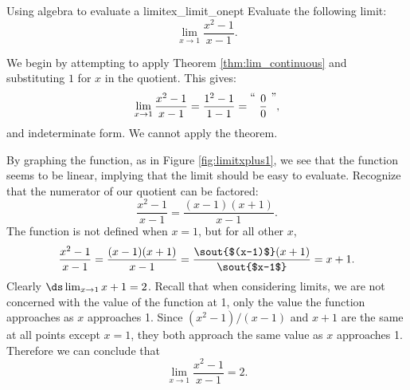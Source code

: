 \begin{example}{Using algebra to evaluate a limit}{ex_limit_onept}
{
Evaluate the following limit: $$\lim_{x\to 1}\frac{x^2-1}{x-1}.$$
}
\end{example}


\begin{solution}
{We begin by attempting to apply Theorem \ref{thm:lim_continuous} and substituting $ 1 $ for $x$ in the quotient. This gives:
		$$\lim_{x\to 1}\frac{x^2-1}{x-1} = \frac{1^2-1}{1-1} = \raisebox{8pt}{\text{``\ }}\frac{0}{0}\raisebox{8pt}{\text{\ ''}},$$ and indeterminate form. We cannot apply the theorem.

		
		By graphing the function, as in Figure \ref{fig:limitxplus1}, we see that the function seems to be linear, implying that the limit should be easy to evaluate. Recognize that the numerator of our quotient can be factored:
		$$\frac{x^2-1}{x-1} = \frac{(x-1)(x+1)}{x-1}.$$
		The function is not defined when $x=1$, but for all other $x$, $$\frac{x^2-1}{x-1} = \frac{(x-1)(x+1)}{x-1} = \frac{\hbox{\sout{$(x-1)$}}(x+1)}{\hbox{\sout{$x-1$}}}= x+1.$$
		Clearly $\ds \lim_{x\to 1}x+1 = 2$. Recall that when considering limits, we are not concerned with the value of the function at 1, only the value the function approaches as $x$ approaches 1. Since $(x^2-1)/(x-1)$ and $x+1$ are the same at all points except $x=1$, they both approach the same value as $x$ approaches 1. Therefore we can conclude that $$\lim_{x\to 1}\frac{x^2-1}{x-1}=2.$$
}
\end{solution}



